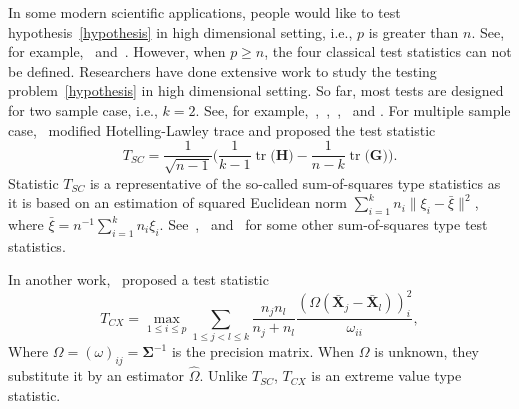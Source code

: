 \documentclass[12pt]{article} %
\DeclareMathOperator{\mytr}{tr}
\newcommand{\bX}{\mathbf{X}}
\newcommand{\bH}{\mathbf{H}}
\newcommand{\bG}{\mathbf{G}}
\newcommand{\bfsym}[1]{\ensuremath{\boldsymbol{#1}}}
\def\bSigma {\bfsym {\Sigma}}
\theoremstyle{definition}
\begin{document}


In some modern scientific applications, people would like to test hypothesis~\eqref{hypothesis} in high dimensional setting, i.e., $p$ is greater than $n$.
See, for example,~\citet{Verstynen1209} and~\citet{Tsai2009}.
However, when $p\geq n$, the four classical test statistics can not be defined.
  Researchers have done extensive work to study the testing problem~\eqref{hypothesis} in high dimensional setting.
 So far, most tests are designed for two sample case, i.e., $k=2$.
  See, for example,~\citet{Bai1996Efiect},~\citet{Chen2010A},~\citet{Srivastava2009A},~\citet{Tony2013} and \citet{Feng2015Multivariate}.
  For multiple sample case,~\cite{Schott2007Some} modified Hotelling-Lawley trace and proposed the test statistic
  $$
  T_{SC}=\frac{1}{\sqrt{n-1}}\Big(
  \frac{1}{k-1}\mytr\big(\bH\big)-\frac{1}{n-k}\mytr\big(\bG\big)
  \Big).
  $$
Statistic $T_{SC}$ is a representative of the so-called sum-of-squares type statistics as it is based on an estimation of squared Euclidean norm $\sum_{i=1}^k n_i\|\xi_i-\bar{\xi}\|^2$, where $\bar{\xi}=n^{-1}\sum_{i=1}^k n_i \xi_i$.
See~\cite{Srivastava2013},~\cite{Yamada2015} and~\cite{Chang2017} for some other sum-of-squares type test statistics.

In another work,~\cite{Cai2014High} proposed a test statistic 
  $$
  T_{CX}=\max_{1\leq i\leq p} \sum_{1\leq j<l\leq k}\frac{n_j n_l}{n_j+n_l}\frac{(\Omega(\bar{\bX}_j-\bar{\bX}_l))_i^2}{\omega_{ii}},
  $$
  Where $\Omega=(\omega)_{ij}=\bSigma^{-1}$ is the precision matrix. When $\Omega$ is unknown, they substitute it by an estimator $\hat{\Omega}$.
  Unlike $T_{SC}$, $T_{CX}$ is an extreme value type statistic.
  
\end{document}
